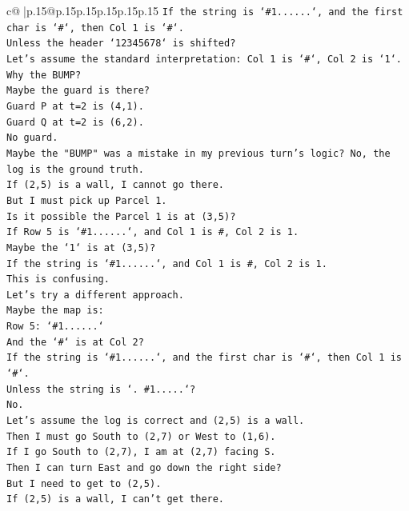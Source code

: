 \documentclass{article}
\begin{document}
{\begin{supertabular}{c@{$\;$}|p{.15\linewidth}@{}p{.15\linewidth}p{.15\linewidth}p{.15\linewidth}p{.15\linewidth}p{.15\linewidth}}
{{{\texttt{If the string is `\#1......`, and the first char is `\#`, then Col 1 is `\#`.} \\
\texttt{Unless the header `12345678` is shifted?} \\
\texttt{Let's assume the standard interpretation: Col 1 is `\#`, Col 2 is `1`.} \\
\texttt{Why the BUMP?} \\
\texttt{Maybe the guard is there?} \\
\texttt{Guard P at t=2 is (4,1).} \\
\texttt{Guard Q at t=2 is (6,2).} \\
\texttt{No guard.} \\
\texttt{Maybe the "BUMP" was a mistake in my previous turn's logic? No, the log is the ground truth.} \\
\texttt{If (2,5) is a wall, I cannot go there.} \\
\texttt{But I must pick up Parcel 1.} \\
\texttt{Is it possible the Parcel 1 is at (3,5)?} \\
\texttt{If Row 5 is `\#1......`, and Col 1 is \#, Col 2 is 1.} \\
\texttt{Maybe the `1` is at (3,5)?} \\
\texttt{If the string is `\#1......`, and Col 1 is \#, Col 2 is 1.} \\
\texttt{This is confusing.} \\
\texttt{Let's try a different approach.} \\
\texttt{Maybe the map is:} \\
\texttt{Row 5: `\#1......`} \\
\texttt{And the `\#` is at Col 2?} \\
\texttt{If the string is `\#1......`, and the first char is `\#`, then Col 1 is `\#`.} \\
\texttt{Unless the string is `. \#1.....`?} \\
\texttt{No.} \\
\texttt{Let's assume the log is correct and (2,5) is a wall.} \\
\texttt{Then I must go South to (2,7) or West to (1,6).} \\
\texttt{If I go South to (2,7), I am at (2,7) facing S.} \\
\texttt{Then I can turn East and go down the right side?} \\
\texttt{But I need to get to (2,5).} \\
\texttt{If (2,5) is a wall, I can't get there.} \\
}}}
\end{supertabular}}
\end{document}
